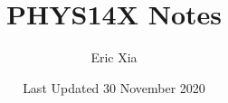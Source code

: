 \documentclass{article}
\title{PHYS14X Notes}
\author{Eric Xia}
\date{Last Updated 30 November 2020}
\begin{document}
    \maketitle
    \tableofcontents
    \pagebreak



    
    
    
    
    
    
    
    
    
    
    
    
    
    
    
    
    
    
    
    
\end{document}
